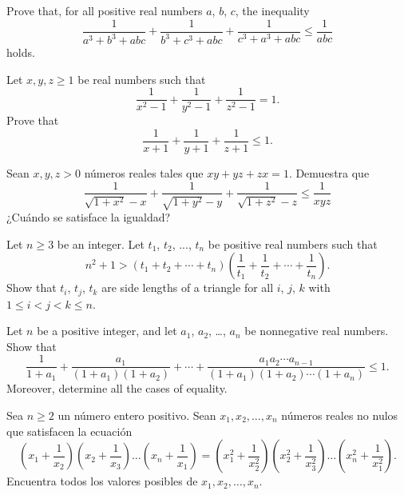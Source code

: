 \documentclass[11pt]{scrartcl}
\begin{document}
\begin{problem} [USAMO 1997/5]
    Prove that, for all positive real numbers $ a$, $ b$, $ c$, the inequality
\[ \frac {1}{a^3 + b^3 + abc} + \frac {1}{b^3 + c^3 + abc} + \frac {1}{c^3 + a^3 + abc} \leq \frac {1}{abc}
\]
holds.
\end{problem}

\begin{problem} [ELMO 2003/4]
    Let $x,y,z \ge 1$ be real numbers such that\[ \frac{1}{x^2-1} + \frac{1}{y^2-1} + \frac{1}{z^2-1} = 1. \]Prove that\[ \frac{1}{x+1} + \frac{1}{y+1} + \frac{1}{z+1} \le 1. \]
\end{problem}

\begin{problem} 
    Sean $x,y,z>0$ números reales tales que $xy+yz+zx=1$. Demuestra que 
    \[\frac{1}{\sqrt{1+x^2}-x}+\frac{1}{\sqrt{1+y^2}-y}+\frac{1}{\sqrt{1+z^2}-z} \leq \frac{1}{xyz}\]
    ¿Cuándo se satisface la igualdad?
\end{problem}

\begin{problem} [IMO 2004/4]
    Let $n \geq 3$ be an integer. Let $t_1$, $t_2$, ..., $t_n$ be positive real numbers such that\[n^2 + 1 > \left( t_1 + t_2 + \cdots + t_n \right) \left( \frac{1}{t_1} + \frac{1}{t_2} + \cdots + \frac{1}{t_n} \right).\]Show that $t_i$, $t_j$, $t_k$ are side lengths of a triangle for all $i$, $j$, $k$ with $1 \leq i < j < k \leq n$.
\end{problem}

\begin{problem} [CGMO 2012/1]
      Let $n$ be a positive integer,
  and let $a_1$, $a_2$, \dots, $a_n$ be nonnegative real numbers.
  Show that
  \[ \frac{1}{1+a_1} + \frac{a_1}{(1+a_1)(1+a_2)} + \dotsb
  + \frac{a_1a_2\dotsm a_{n-1}}{(1+a_1)(1+a_2)\dotsm(1+a_n)}
  \le 1. \]
  Moreover, determine all the cases of equality.
\end{problem}

\begin{problem}
    [OMM 2020/6]
    
    Sea $n\ge 2$ un número entero positivo. Sean $x_1, x_2, \dots, x_n$ números reales no nulos que satisfacen la ecuación
\[\left(x_1+\frac{1}{x_2}\right)\left(x_2+\frac{1}{x_3}\right)\dots\left(x_n+\frac{1}{x_1}\right)=\left(x_1^2+\frac{1}{x_2^2}\right)\left(x_2^2+\frac{1}{x_3^2}\right)\dots\left(x_n^2+\frac{1}{x_1^2}\right). \]
Encuentra todos los valores posibles de $x_1, x_2, \dots, x_n$.
\end{problem}
\end{document}
